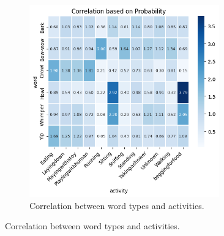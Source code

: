 \begin{figure}[th]
\begin{subfigure}[t]{0.49\textwidth}
	\includegraphics[width=0.9\textwidth]{images/sound_activity_prior.png}
	\caption{Correlation between word types and activities.}
	\label{fig:sound_activity}
\end{subfigure}


\end{figure}
